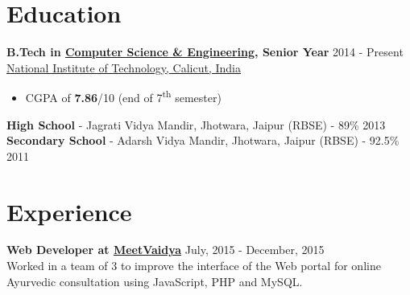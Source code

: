 \documentclass[margin, centered, 10.5pt]{res}
\begin{document}
\begin{resume}

\section{Education}
\textbf{B.Tech in \href{http://cse.nitc.ac.in}{Computer Science \& Engineering}, Senior Year} \hfill 2014 - Present \\
\href{http://nitc.ac.in/}{National Institute of Technology, Calicut, India}
\begin{itemize}
 \item CGPA of \textbf{7.86}/10 (end of 7\textsuperscript{th} semester)
\end{itemize}
\textbf{High School} - {Jagrati Vidya Mandir, Jhotwara, Jaipur} (RBSE) - 89\% \hfill 2013 \\
\textbf{Secondary School} - Adarsh Vidya Mandir, Jhotwara, Jaipur (RBSE) - 92.5\% \hfill 2011

\section{Experience}
\textbf{Web Developer at \href{http://www.meetvaidya.com}{MeetVaidya}} \hfill July, 2015 - December, 2015\\
Worked in a team of 3 to improve the interface of the Web portal for online Ayurvedic consultation using JavaScript, PHP and MySQL.


\end{resume}
\end{document}
